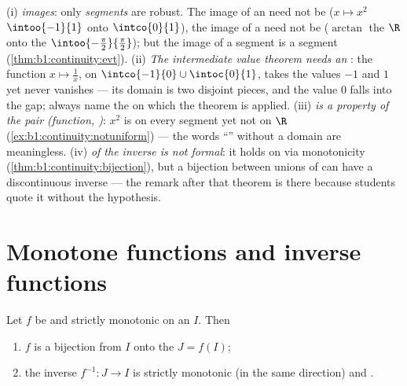 \begin{remark}
(i) \emph{ images}: only \emph{segments} are robust.
The  image of an   need not be 
($x \mapsto x^2$  $\intoo{-1}{1}$ onto $\intco{0}{1}$), the
image of a  need not be  ($\arctan$  the
 $\R$ onto the 
$\intoo{-\frac\pi2}{\frac\pi2}$); but the image of a segment is
a segment (\cref{thm:b1:continuity:evt}). (ii) \emph{The
intermediate value theorem needs an }: the function $x
\mapsto \frac1x$,  on $\intco{-1}{0} \cup
\intoc{0}{1}$, takes the values $-1$ and $1$ yet never
vanishes --- its domain is two disjoint pieces, and the value
$0$ falls into the gap; always name the  on which the
theorem is applied. (iii) \emph{ is a property of the
pair (function, )}: $x^2$ is  on every
segment yet not on $\R$
(\cref{ex:b1:continuity:notuniform}) --- the words ``'' without a domain are meaningless. (iv)
\emph{ of the inverse is not formal}: it holds on
 via monotonicity
(\cref{thm:b1:continuity:bijection}), but a  bijection
between unions of  can have a discontinuous inverse ---
the remark after that theorem is there because students quote it
without the  hypothesis.
\end{remark}

\section{Monotone functions and inverse functions}

\begin{theorem}\label{thm:b1:continuity:bijection}
Let $f$ be  and strictly monotonic on an  $I$. Then
\begin{enumerate}
  \item $f$ is a bijection from $I$ onto the  $J = f(I)$;
  \item the inverse $f^{-1} \colon J \to I$ is strictly monotonic (in
        the same direction) and \emph{}.
\end{enumerate}
\end{theorem}

